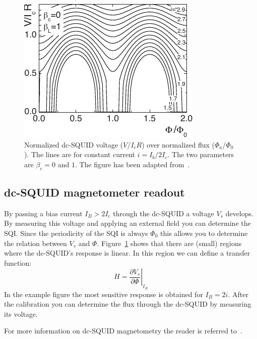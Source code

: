 \begin{figure}[ht!]
	\centering
	\includegraphics{figures/example_SQI.pdf}
	\caption{Normalized dc-SQUID voltage ($V/I_cR$) over normalized flux ($\Phi_a/\Phi_0$). The lines are for constant current $i=I_b/2I_c$. The two parameters are $\beta_c = 0$ and $1$. The figure has been adapted from~\cite{clarkeSQUIDHandbook2004}.}
	\label{fig:example-SQI}
\end{figure}

\subsection{dc-SQUID magnetometer readout}
By passing a bias current $I_B > 2I_c$ through the dc-SQUID a voltage $V_s$ develops. By measuring this voltage and applying an external field you can determine the SQI. Since the periodicity of the SQI is always $\Phi_0$ this allows you to determine the relation between $V_s$ and $\Phi$. Figure~\ref{fig:example-SQI} shows that there are (small) regions where the dc-SQUID's response is linear. In this region we can define a transfer function\cite{rogSQUIDontipMagneticMicroscopy2022}:
\begin{equation}
	H = \left. \frac{\partial V_s}{\partial \Phi} \right|_{I_B}
\end{equation}
In the example figure the most sensitive response is obtained for $I_B = 2i$. After the calibration you can determine the flux through the dc-SQUID by measuring its voltage.

For more information on dc-SQUID magnetometry the reader is referred to~\cite{tinkhamIntroductionSuperconductivity,clarkeSQUIDHandbook2004,schmelzSuperconductingQuantumInterference2017}.